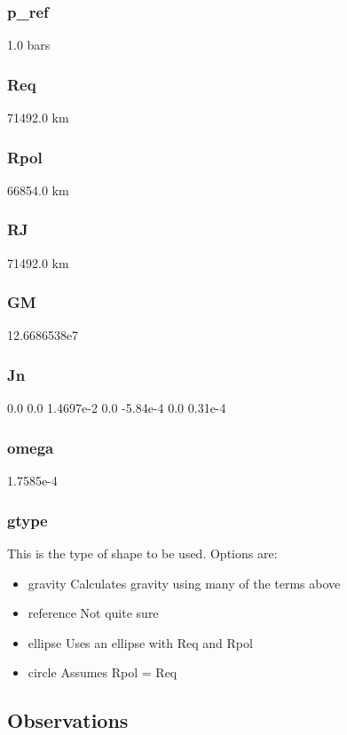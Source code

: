 \documentclass[11pt]{article}
\begin{document}
\subsubsection{p\_ref}
1.0      bars

\subsubsection{Req}
      71492.0  km

\subsubsection{Rpol}
     66854.0  km

\subsubsection{RJ}
       71492.0  km

\subsubsection{GM}
       12.6686538e7

\subsubsection{Jn}
       0.0 0.0 1.4697e-2 0.0 -5.84e-4 0.0 0.31e-4

\subsubsection{omega}
    1.7585e-4

\subsubsection{gtype}
This is the type of shape to be used.  Options are:

\begin{itemize}
\item{gravity} Calculates gravity using many of the terms above
\item{reference} Not quite sure
\item{ellipse} Uses an ellipse with Req and Rpol
\item{circle} Assumes Rpol = Req
\end{itemize}

\subsection{Observations}
\end{document}
